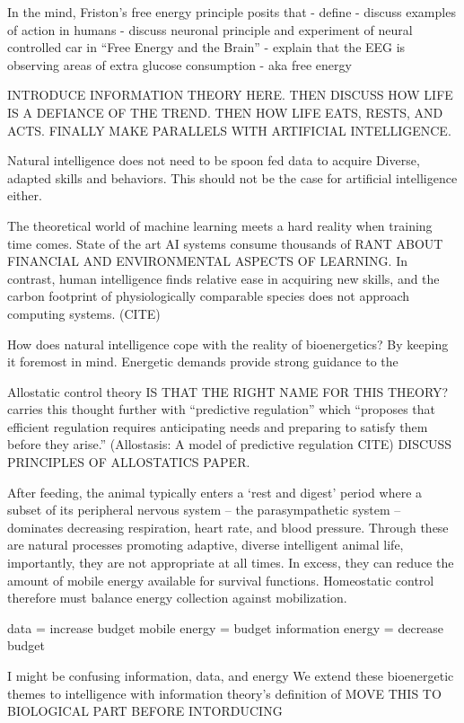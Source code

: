 \documentclass{article}
\begin{document}
In the mind, Friston’s free energy principle posits that 
- define
- discuss examples of action in humans
- discuss neuronal principle and experiment of neural controlled car in “Free Energy and the Brain”
- explain that the EEG is observing areas of extra glucose consumption - aka free energy



INTRODUCE INFORMATION THEORY HERE. THEN DISCUSS HOW LIFE IS A DEFIANCE OF THE TREND. THEN HOW LIFE EATS, RESTS, AND ACTS. FINALLY MAKE PARALLELS WITH ARTIFICIAL INTELLIGENCE. 

Natural intelligence does not need to be spoon fed data to acquire Diverse, adapted skills and behaviors. This should not be the case for artificial intelligence either. 

The theoretical world of machine learning meets a hard reality when training time comes. State of the art AI systems consume thousands of RANT ABOUT FINANCIAL AND ENVIRONMENTAL ASPECTS OF LEARNING. In contrast, human intelligence finds relative ease in acquiring new skills, and the carbon footprint of physiologically comparable species does not approach computing systems. (CITE) 

How does natural intelligence cope with the reality of bioenergetics? By keeping it foremost in mind. Energetic demands provide strong guidance to the

Allostatic control theory IS THAT THE RIGHT NAME FOR THIS THEORY?        carries this thought further with “predictive regulation” which “proposes that efficient regulation requires anticipating needs and preparing to satisfy them before they arise.” (Allostasis: A model of predictive regulation CITE) DISCUSS PRINCIPLES OF ALLOSTATICS PAPER.

After feeding, the animal typically enters a ‘rest and digest’ period where a subset of its peripheral nervous system -- the parasympathetic system -- dominates decreasing respiration, heart rate, and blood pressure. Through these are natural processes promoting adaptive, diverse intelligent animal life, importantly, they are not appropriate at all times. In excess, they can reduce the amount of mobile energy available for survival functions. Homeostatic control therefore must balance energy collection against mobilization.
 
data = increase budget
mobile energy = budget
information energy = decrease budget

I might be confusing information, data, and energy
We extend these bioenergetic themes to intelligence with information theory’s definition of MOVE THIS TO BIOLOGICAL PART BEFORE INTORDUCING 
\end{document}

